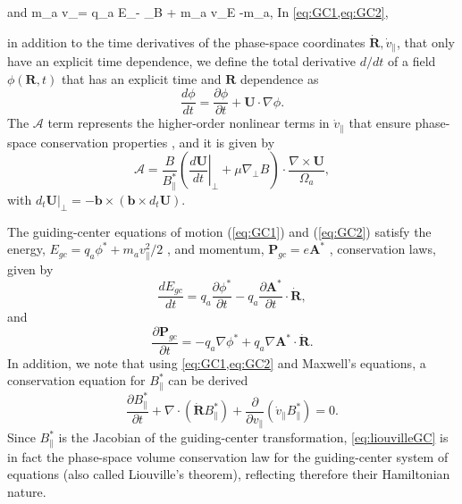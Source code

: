     \label{eq:GC1}
\ee
%
and
%
\be
    m_a \dot v_\parallel = q_a E_\parallel - \mu \nabla_\parallel B + m_a \mathbf v_E \cdot {}-m_a,
    \label{eq:GC2}
\ee
%
In \cref{eq:GC1,eq:GC2}, {in addition to the time derivatives of the phase-space coordinates $\dot{\mathbf R}, \dot v_{\parallel}$, that only have an explicit time dependence, we define the total derivative $d/dt$ of a field $\phi(\mathbf R, t)$ that has an explicit time and $\mathbf R$ dependence as
%
\begin{equation}
    \frac{d\phi}{dt} = \frac{\partial \phi}{\partial t} + \mathbf U \cdot \nabla \phi.
\end{equation}
%
The $\mathcal{A}$ term represents the higher-order nonlinear terms in $\dot v_\parallel$ that ensure phase-space conservation properties \citep{Cary2009}, and it is given by
%
\begin{equation}
    \mathcal{A}=\frac{B}{B_\parallel^*}\left(\left.\frac{d \mathbf U}{dt}\right|_\perp + \mu \nabla_\perp B\right)\cdot \frac{\nabla \times \mathbf U}{\Omega_a},
\end{equation}
%
with $d_t\mathbf U|_\perp=-\mathbf b \times (\mathbf b \times d_t\mathbf U)$.

The guiding-center equations of motion (\ref{eq:GC1}) and (\ref{eq:GC2}) satisfy the energy, $E_{gc} = q_a \phi^*+m_a v_\parallel^2/2$ \citep{Cary2009}, and momentum, $\mathbf P_{gc} = e \mathbf A^*$ \citep{Cary2009}, conservation laws, given by
%
\begin{equation}
    \frac{d E_{gc}}{dt} = q_a \frac{\partial \phi^*}{\partial t}- q_a \frac{\partial \mathbf A^*}{\partial t}\cdot \dot{\mathbf R},
    \label{eq:enconservation}
\end{equation}
%
and
%
\begin{equation}
    \frac{\partial \mathbf P_{gc}}{\partial t} = -q_a \nabla \phi^* + q_a \nabla \mathbf A^* \cdot \dot{\mathbf R}.
    \label{eq:moconservation}
\end{equation}
%
In addition, we note that using \cref{eq:GC1,eq:GC2} and Maxwell's equations, a conservation equation for $B_{\parallel}^*$ can be derived
%
\begin{equation}
    \frac{\partial B_{\parallel}^*}{\partial t} + \nabla \cdot (\dot{\mathbf R} B_{\parallel}^*) + \frac{\partial}{\partial v_\parallel}\left(\dot v_\parallel B_{\parallel}^* \right)=0.
    \label{eq:liouvilleGC}
\end{equation}
%
Since $B_{\parallel}^*$ is the Jacobian of the guiding-center transformation, \cref{eq:liouvilleGC} is in fact the phase-space volume conservation law for the guiding-center system of equations (also called Liouville's theorem), reflecting therefore their Hamiltonian nature.

}
